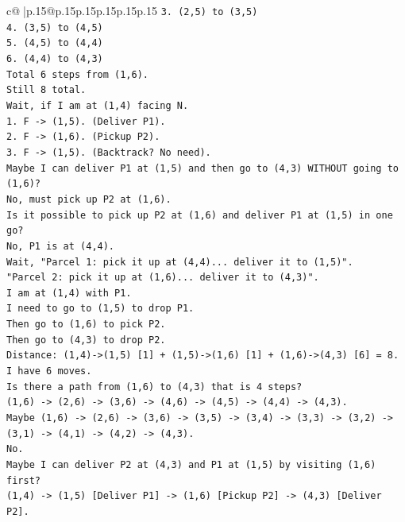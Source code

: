 \documentclass{article}
\begin{document}
{\begin{supertabular}{c@{$\;$}|p{.15\linewidth}@{}p{.15\linewidth}p{.15\linewidth}p{.15\linewidth}p{.15\linewidth}p{.15\linewidth}}
{{{\texttt{3. (2,5) to (3,5)} \\
\texttt{4. (3,5) to (4,5)} \\
\texttt{5. (4,5) to (4,4)} \\
\texttt{6. (4,4) to (4,3)} \\
\texttt{Total 6 steps from (1,6).} \\
\texttt{Still 8 total.} \\
\texttt{Wait, if I am at (1,4) facing N.} \\
\texttt{1. F {-}> (1,5). (Deliver P1).} \\
\texttt{2. F {-}> (1,6). (Pickup P2).} \\
\texttt{3. F {-}> (1,5). (Backtrack? No need).} \\
\texttt{Maybe I can deliver P1 at (1,5) and then go to (4,3) WITHOUT going to (1,6)?} \\
\texttt{No, must pick up P2 at (1,6).} \\
\texttt{Is it possible to pick up P2 at (1,6) and deliver P1 at (1,5) in one go?} \\
\texttt{No, P1 is at (4,4).} \\
\texttt{Wait, "Parcel 1: pick it up at (4,4)... deliver it to (1,5)".} \\
\texttt{"Parcel 2: pick it up at (1,6)... deliver it to (4,3)".} \\
\texttt{I am at (1,4) with P1.} \\
\texttt{I need to go to (1,5) to drop P1.} \\
\texttt{Then go to (1,6) to pick P2.} \\
\texttt{Then go to (4,3) to drop P2.} \\
\texttt{Distance: (1,4){-}>(1,5) {[}1{]} + (1,5){-}>(1,6) {[}1{]} + (1,6){-}>(4,3) {[}6{]} = 8.} \\
\texttt{I have 6 moves.} \\
\texttt{Is there a path from (1,6) to (4,3) that is 4 steps?} \\
\texttt{(1,6) {-}> (2,6) {-}> (3,6) {-}> (4,6) {-}> (4,5) {-}> (4,4) {-}> (4,3).} \\
\texttt{Maybe (1,6) {-}> (2,6) {-}> (3,6) {-}> (3,5) {-}> (3,4) {-}> (3,3) {-}> (3,2) {-}> (3,1) {-}> (4,1) {-}> (4,2) {-}> (4,3).} \\
\texttt{No.} \\
\texttt{Maybe I can deliver P2 at (4,3) and P1 at (1,5) by visiting (1,6) first?} \\
\texttt{(1,4) {-}> (1,5) {[}Deliver P1{]} {-}> (1,6) {[}Pickup P2{]} {-}> (4,3) {[}Deliver P2{]}.} \\
}}}
\end{supertabular}}
\end{document}

